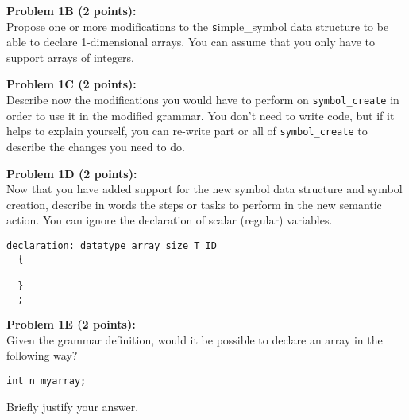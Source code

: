 \begin{tcolorbox}[height=3in]

\end{tcolorbox}

\pagebreak
{\bf Problem 1B (2 points):}
\\
Propose one or more modifications
to the {\texttt simple\_symbol} data structure to be able to declare 1-dimensional arrays. 
You can assume that you
only have to support arrays of integers. 

\begin{tcolorbox}[height=3in]

\end{tcolorbox}



{\bf Problem 1C (2 points):}
\\
Describe now the modifications you would have to perform on \texttt{symbol\_create} in order to use
it in the modified grammar. You don't need to write code, but if it helps to explain yourself,
you can re-write part or all of \texttt{symbol\_create} to describe the changes you need to do.

\begin{tcolorbox}[height=4in]

\end{tcolorbox}


\pagebreak
{\bf Problem 1D (2 points):}
\\
Now that you have added support for the new symbol data structure and symbol creation, describe in
words the steps or tasks to perform in the new semantic action. You can ignore the declaration
of scalar (regular) variables.

\begin{lstlisting}
declaration: datatype array_size T_ID 
  { 

  }
  ;
\end{lstlisting}

\begin{tcolorbox}[height=4in]

\end{tcolorbox}


{\bf Problem 1E (2 points):}
\\
Given the grammar definition, would it be possible to declare an array in the following way?

\begin{lstlisting}
int n myarray;
\end{lstlisting}


Briefly justify your answer.

\begin{tcolorbox}[height=2in]

\end{tcolorbox}
